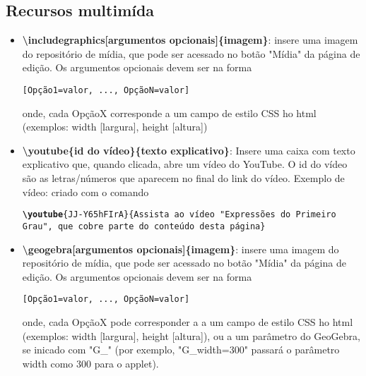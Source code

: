 

\newcommand{\com}[1]{\textbf{\backslash#1}}
\newcommand{\comp}[2]{\textbf{\backslash#1\{#2\}}}
\newcommand{\compp}[3]{\textbf{\backslash#1\{#2\}\{#3\}}}
\newcommand{\comop}[3]{\textbf{\backslash#1[#2]\{#3\}}}

\subsection{Recursos multimída}

\begin{itemize}
    \item \comop{includegraphics}{argumentos opcionais}{imagem}: insere uma imagem do repositório de mídia, que pode ser acessado no botão "Mídia" da página de edição. Os argumentos opcionais devem ser na forma 
    \begin{center}
        \texttt{[Opção1=valor, ..., OpçãoN=valor]}
    \end{center}
    onde, cada OpçãoX corresponde a um campo de estilo CSS ho html (exemplos: width [largura], height [altura])
    \item \compp{youtube}{id do vídeo}{texto explicativo}: Insere uma caixa com texto explicativo que, quando clicada, abre um vídeo do YouTube. O id do vídeo são as letras/números que aparecem no final do link do vídeo. Exemplo de vídeo:
    criado com o comando
    \begin{center}
        \texttt{\com{youtube}\{JJ-Y65hFIrA\}\{Assista ao vídeo "Expressões do Primeiro Grau", que cobre parte do conteúdo desta página\}}
    \end{center}
    
    \item \comop{geogebra}{argumentos opcionais}{imagem}: insere uma imagem do repositório de mídia, que pode ser acessado no botão "Mídia" da página de edição. Os argumentos opcionais devem ser na forma 
    \begin{center}
        \texttt{[Opção1=valor, ..., OpçãoN=valor]}
    \end{center}
    onde, cada OpçãoX pode corresponder a a um campo de estilo CSS ho html (exemplos: width [largura], height [altura]), ou a um parâmetro do GeoGebra, se inicado com "G_" (por exemplo, "G_width=300" passará o parâmetro width como 300 para o applet).
\end{itemize}

